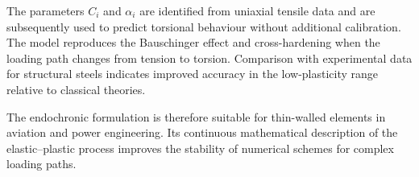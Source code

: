 The parameters $C_i$ and $\alpha_i$ are identified from uniaxial tensile data and are subsequently used to predict torsional behaviour without additional calibration. The model reproduces the Bauschinger effect and cross-hardening when the loading path changes from tension to torsion. Comparison with experimental data for structural steels indicates improved accuracy in the low-plasticity range relative to classical theories.

The endochronic formulation is therefore suitable for thin-walled elements in aviation and power engineering. Its continuous mathematical description of the elastic--plastic process improves the stability of numerical schemes for complex loading paths.
